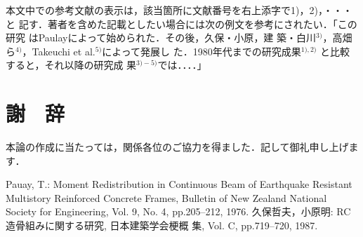 \documentclass{jaee}
\begin{document}
本文中での参考文献の表示は，該当箇所に文献番号を右上添字で1)，2)，・・・と
記す．著者を含めた記載としたい場合には次の例文を参考にされたい．「この研究
はPaulay\cite{bib:1}によって始められた．その後，久保・小原\cite{bib:2}，建
築・白川$^{3)}$，高畑ら$^{4)}$，Takeuchi et al.$^{5)}$によって発展し
た．1980年代までの研究成果$^{1), 2)}$ と比較すると，それ以降の研究成
果$^{3)-5)}$では．．．．」\vspace{\baselineskip}

\section*{謝　辞}
\label{sec:shaji}
\vspace{-0.6\baselineskip}

本論の作成に当たっては，関係各位のご協力を得ました．記して御礼申し上げます．

\begin{thebibliography}{99}
 Pauay, T.: Moment Redistribution in Continuous Beam of
  Earthquake Resistant Multistory Reinforced Concrete Frames, Bulletin of
  New Zealand National Society for Engineering, Vol. 9, No. 4,
  pp.205--212, 1976.
 久保哲夫，小原明: RC造骨組みに関する研究, 日本建築学会梗概
  集, Vol. C, pp.719--720, 1987.
\end{thebibliography}
\end{document}
